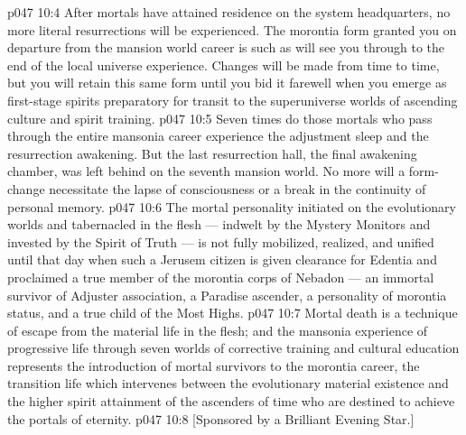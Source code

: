 \vs p047 10:4 \pc After mortals have attained residence on the system headquarters, no more literal resurrections will be experienced. The morontia form granted you on departure from the mansion world career is such as will see you through to the end of the local universe experience. Changes will be made from time to time, but you will retain this same form until you bid it farewell when you emerge as first\hyp{}stage spirits preparatory for transit to the superuniverse worlds of ascending culture and spirit training.
\vs p047 10:5 Seven times do those mortals who pass through the entire mansonia career experience the adjustment sleep and the resurrection awakening. But the last resurrection hall, the final awakening chamber, was left behind on the seventh mansion world. No more will a form\hyp{}change necessitate the lapse of consciousness or a break in the continuity of personal memory.
\vs p047 10:6 \pc The mortal personality initiated on the evolutionary worlds and tabernacled in the flesh --- indwelt by the Mystery Monitors and invested by the Spirit of Truth --- is not fully mobilized, realized, and unified until that day when such a Jerusem citizen is given clearance for Edentia and proclaimed a true member of the morontia corps of Nebadon --- an immortal survivor of Adjuster association, a Paradise ascender, a personality of morontia status, and a true child of the Most Highs.
\vs p047 10:7 \pc Mortal death is a technique of escape from the material life in the flesh; and the mansonia experience of progressive life through seven worlds of corrective training and cultural education represents the introduction of mortal survivors to the morontia career, the transition life which intervenes between the evolutionary material existence and the higher spirit attainment of the ascenders of time who are destined to achieve the portals of eternity.
\vsetoff
\vs p047 10:8 [Sponsored by a Brilliant Evening Star.]
\quizlink
